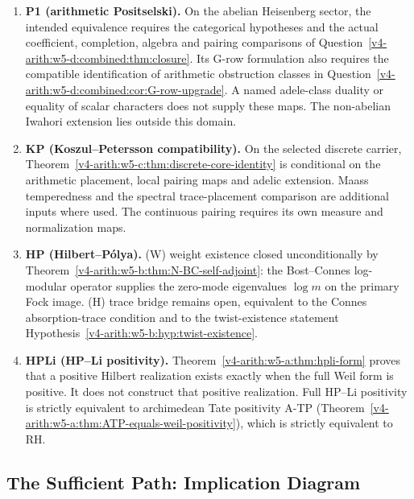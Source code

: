 \begin{enumerate}
\item \textbf{P1 (arithmetic Positselski).} On the abelian Heisenberg
sector, the intended equivalence requires the categorical hypotheses
and the actual coefficient, completion, algebra and pairing comparisons
of Question~\ref{v4-arith:w5-d:combined:thm:closure}. Its G-row formulation
also requires the compatible identification of arithmetic obstruction
classes in Question~\ref{v4-arith:w5-d:combined:cor:G-row-upgrade}.
A named adele-class duality or equality of scalar characters does not
supply these maps. The non-abelian Iwahori extension lies outside this
domain.
\item \textbf{KP (Koszul--Petersson compatibility).} On the selected
discrete carrier, Theorem~\ref{v4-arith:w5-c:thm:discrete-core-identity}
is conditional on the arithmetic placement, local pairing maps and
adelic extension. Maass temperedness and the spectral trace-placement
comparison are additional inputs where used. The continuous pairing
requires its own measure and normalization maps.
\item \textbf{HP (Hilbert--P\'olya).} (W) weight existence closed
unconditionally by
Theorem~\ref{v4-arith:w5-b:thm:N-BC-self-adjoint}: the Bost--Connes
log-modular operator supplies the zero-mode eigenvalues \(\log m\)
on the primary Fock image. (H) trace bridge remains open,
equivalent to the Connes absorption-trace condition and to the
twist-existence statement
Hypothesis~\ref{v4-arith:w5-b:hyp:twist-existence}.
\item \textbf{HPLi (HP--Li positivity).}
Theorem~\ref{v4-arith:w5-a:thm:hpli-form} proves that a positive Hilbert
realization exists exactly when the full Weil form is positive.
It does not construct that positive realization. Full HP--Li positivity is
strictly equivalent to archimedean Tate positivity A-TP
(Theorem~\ref{v4-arith:w5-a:thm:ATP-equals-weil-positivity}), which is
strictly equivalent to RH.
\end{enumerate}

\subsection{The Sufficient Path: Implication Diagram}
\label{v4-arith:w5-synth:implication-diagram}

